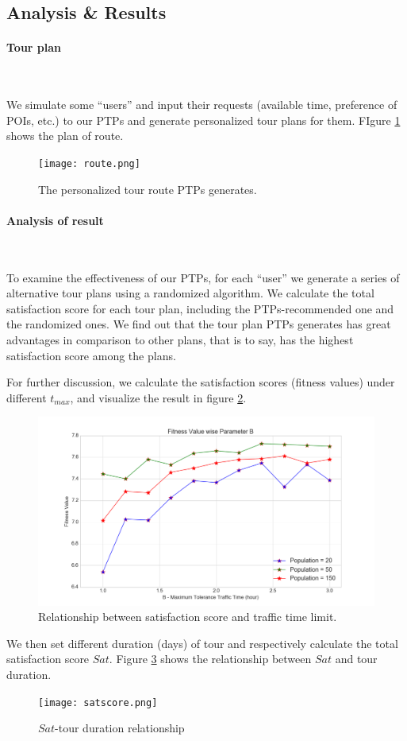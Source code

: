 \documentclass{mcmthesis}
\begin{document}
\subsection{Analysis \& Results}
  \paragraph{Tour plan} \
  
  We simulate some ``users'' and input their requests (available time, preference of POIs, etc.) to our PTPs and generate personalized tour plans for them. FIgure \ref{fig:route} shows the plan of route.
  \begin{figure}[ht]
    \centering
    \texttt{[image: route.png]}
    \caption{The personalized tour route PTPs generates.}
    \label{fig:route}
  \end{figure}
  \paragraph{Analysis of result} \
  
  To examine the effectiveness of our PTPs, for each ``user'' we generate a series of alternative tour plans using a randomized algorithm. We calculate the total satisfaction score for each tour plan, including the PTPs-recommended one and the randomized ones. We find out that the tour plan PTPs generates has great advantages in comparison to other plans, that is to say, has the highest satisfaction score among the plans. \par
  For further discussion, we calculate the satisfaction scores (fitness values) under different $t_{max}$, and visualize the result in figure \ref{fig:sstt}. \par
  \begin{figure}[ht]
    \centering
    \includegraphics[width=\textwidth]{popularity.png}
    \caption{Relationship between satisfaction score and traffic time limit.}
    \label{fig:sstt}
  \end{figure}
  We then set different duration (days) of tour and respectively calculate the total satisfaction score $Sat$. Figure \ref{fig:satscore} shows the relationship between $Sat$ and tour duration. \par
  \begin{figure}[ht]
    \centering
    \texttt{[image: satscore.png]}
    \caption{$Sat$-tour duration relationship}
    \label{fig:satscore}
  \end{figure}
\end{document}
